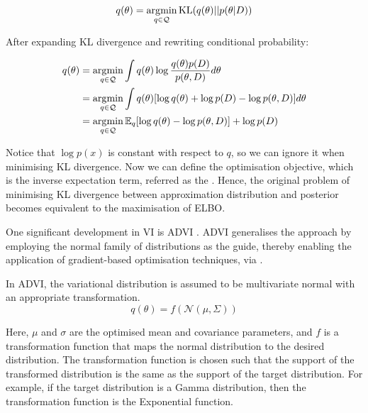\begin{equation}
q(\theta) = \operatorname*{\arg\!\min}_{q \in \mathcal{Q}} \text{KL}(q(\theta) || p(\theta | D))  
\end{equation}

After expanding KL divergence and rewriting conditional probability:

\begin{align}
q(\theta) &= \operatorname*{\arg\!\min}_{q \in \mathcal{Q}} \int q(\theta) \log \frac{q(\theta) p(D)}{p(\theta, D)} d\theta \\
&= \operatorname*{\arg\!\min}_{q \in \mathcal{Q}} \int q(\theta) [\log q(\theta) + \log p(D) - \log p(\theta, D)] d\theta \\
&= \operatorname*{\arg\!\min}_{q \in \mathcal{Q}} \mathbb{E}_q [\log q(\theta) -  \log p(\theta, D)] + \log p(D)
\end{align}

Notice that $\log p(x)$ is constant with respect to $q$, so we can ignore it when minimising KL divergence. Now we can define the optimisation objective, which is the inverse expectation term, referred as the . Hence, the original problem of minimising KL divergence between approximation distribution and posterior becomes equivalent to the maximisation of \ac{ELBO}. 

One significant development in \ac{VI} is \ac{ADVI} \parencite{Kucukelbir2016-gn}. \ac{ADVI} generalises the approach by employing the normal family of distributions as the guide, thereby enabling the application of gradient-based optimisation techniques, via .

In \ac{ADVI}, the variational distribution is assumed to be multivariate normal with an appropriate transformation.
\begin{equation}
q(\theta) = f(\mathcal{N}(\mu, \Sigma))
\end{equation}

Here, $\mu$ and $\sigma$ are the optimised mean and covariance parameters, and $f$ is a transformation function that maps the normal distribution to the desired distribution. The transformation function is chosen such that the support of the transformed distribution is the same as the support of the target distribution. For example, if the target distribution is a Gamma distribution, then the transformation function is the Exponential function. 

